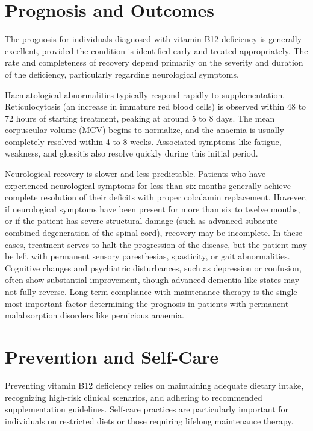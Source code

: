 \section*{Prognosis and Outcomes}
The prognosis for individuals diagnosed with vitamin B12 deficiency is generally excellent, provided the condition is identified early and treated appropriately. The rate and completeness of recovery depend primarily on the severity and duration of the deficiency, particularly regarding neurological symptoms.

Haematological abnormalities typically respond rapidly to supplementation. Reticulocytosis (an increase in immature red blood cells) is observed within 48 to 72 hours of starting treatment, peaking at around 5 to 8 days. The mean corpuscular volume (MCV) begins to normalize, and the anaemia is usually completely resolved within 4 to 8 weeks. Associated symptoms like fatigue, weakness, and glossitis also resolve quickly during this initial period.

Neurological recovery is slower and less predictable. Patients who have experienced neurological symptoms for less than six months generally achieve complete resolution of their deficits with proper cobalamin replacement. However, if neurological symptoms have been present for more than six to twelve months, or if the patient has severe structural damage (such as advanced subacute combined degeneration of the spinal cord), recovery may be incomplete. In these cases, treatment serves to halt the progression of the disease, but the patient may be left with permanent sensory paresthesias, spasticity, or gait abnormalities. Cognitive changes and psychiatric disturbances, such as depression or confusion, often show substantial improvement, though advanced dementia-like states may not fully reverse. Long-term compliance with maintenance therapy is the single most important factor determining the prognosis in patients with permanent malabsorption disorders like pernicious anaemia.

\section*{Prevention and Self-Care}
Preventing vitamin B12 deficiency relies on maintaining adequate dietary intake, recognizing high-risk clinical scenarios, and adhering to recommended supplementation guidelines. Self-care practices are particularly important for individuals on restricted diets or those requiring lifelong maintenance therapy.

